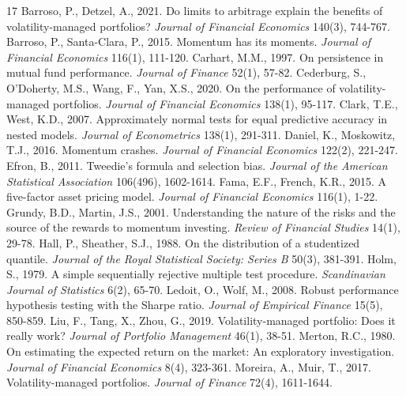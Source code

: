 \documentclass[11pt]{article}
\begin{document}
\begin{thebibliography}{17}
 Barroso, P., Detzel, A., 2021. Do limits to arbitrage explain the benefits of volatility-managed portfolios? \textit{Journal of Financial Economics} 140(3), 744-767.
 Barroso, P., Santa-Clara, P., 2015. Momentum has its moments. \textit{Journal of Financial Economics} 116(1), 111-120.
 Carhart, M.M., 1997. On persistence in mutual fund performance. \textit{Journal of Finance} 52(1), 57-82.
 Cederburg, S., O'Doherty, M.S., Wang, F., Yan, X.S., 2020. On the performance of volatility-managed portfolios. \textit{Journal of Financial Economics} 138(1), 95-117.
 Clark, T.E., West, K.D., 2007. Approximately normal tests for equal predictive accuracy in nested models. \textit{Journal of Econometrics} 138(1), 291-311.
 Daniel, K., Moskowitz, T.J., 2016. Momentum crashes. \textit{Journal of Financial Economics} 122(2), 221-247.
 Efron, B., 2011. Tweedie's formula and selection bias. \textit{Journal of the American Statistical Association} 106(496), 1602-1614.
 Fama, E.F., French, K.R., 2015. A five-factor asset pricing model. \textit{Journal of Financial Economics} 116(1), 1-22.
 Grundy, B.D., Martin, J.S., 2001. Understanding the nature of the risks and the source of the rewards to momentum investing. \textit{Review of Financial Studies} 14(1), 29-78.
 Hall, P., Sheather, S.J., 1988. On the distribution of a studentized quantile. \textit{Journal of the Royal Statistical Society: Series B} 50(3), 381-391.
 Holm, S., 1979. A simple sequentially rejective multiple test procedure. \textit{Scandinavian Journal of Statistics} 6(2), 65-70.
 Ledoit, O., Wolf, M., 2008. Robust performance hypothesis testing with the Sharpe ratio. \textit{Journal of Empirical Finance} 15(5), 850-859.
 Liu, F., Tang, X., Zhou, G., 2019. Volatility-managed portfolio: Does it really work? \textit{Journal of Portfolio Management} 46(1), 38-51.
 Merton, R.C., 1980. On estimating the expected return on the market: An exploratory investigation. \textit{Journal of Financial Economics} 8(4), 323-361.
 Moreira, A., Muir, T., 2017. Volatility-managed portfolios. \textit{Journal of Finance} 72(4), 1611-1644.
\end{thebibliography}
\end{document}
